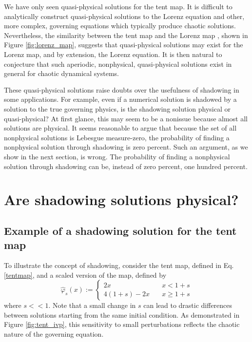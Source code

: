 \documentclass[preprint,12pt]{elsarticle}
\begin{document}
We have only seen quasi-physical solutions for the tent map.
It is difficult to analytically construct quasi-physical solutions
to the Lorenz equation and other, more complex, governing
equations which typically produce chaotic solutions.  Nevertheless, the similarity 
between the tent map and the Lorenz map \cite{tent2}, shown in Figure \ref{fig:lorenz_map}, suggests that
quasi-physical solutions may exist for the Lorenz map, and by
extension, the Lorenz equation.  It is then natural to conjecture
that such aperiodic, nonphysical, quasi-physical solutions
exist in general for chaotic dynamical systems.

These quasi-physical solutions raise doubts over the usefulness of shadowing
in some applications.  For example, even if a numerical
solution is shadowed by a solution to the true governing physics,
is the shadowing solution physical or quasi-physical? At first glance, this may 
seem to be a nonissue because almost all solutions are physical. 
It seems reasonable to argue that because the set of
all nonphysical solutions is Lebesgue measure-zero, the probability of finding
a nonphysical solution through shadowing is zero percent.  Such an argument,
as we show in the next section, is wrong.  The probability of
finding a nonphysical solution through shadowing can be, instead of
zero percent, one hundred percent.

\section{Are shadowing solutions physical?}
\label{sec:shadowingnonphysical}
\subsection{Example of a shadowing solution for the tent map}
\label{sec:sub:shadow-example}
To illustrate the concept of shadowing, consider the tent map, defined
in Eq. \ref{tentmap}, and a scaled version of the map, defined by
\begin{equation} \label{tent_scaled}
    \hat\varphi_s(x) := \begin{cases}
    2x \quad & x < 1+s \\
    4(1+s) - 2x \quad & x \ge 1+s
    \end{cases}
\end{equation}
where $s<<1$.  Note that a small change in $s$ can lead to drastic differences 
between solutions starting from the same initial condition.
As demonstrated in Figure \ref{fig:tent_ivp}, this sensitivity to small
perturbations reflects the chaotic nature of the governing equation.
\end{document}
